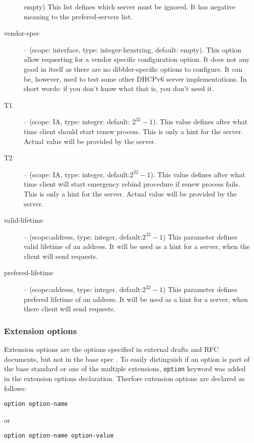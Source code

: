 \begin{description}
	    empty) This list defines which server must be ignored. It
	    has negative meaning to the prefered-servers list.
 \item[vendor-spec] -- (scope: interface, type: integer-hexstring,
	    default: empty). This option allow requesting for a vendor
	    specific configuration option. It does not any good in
	    itself as there are no dibbler-specific options to
	    configure. It can be, however, used to test some other
	    DHCPv6 server implementations. In short words: if you don't
	    know what that is, you don't need it.
 \item[T1] -- (scope: IA, type: integer: default: $2^{32}-1$). This value
	    defines after what time client should start renew
	    process. This is only a hint for the server. Actual value
	    will be provided by the server.
 \item[T2] -- (scope: IA, type: integer, default:$2^{32}-1$). This value
	    defines after what time client will start emergency rebind
	    procedure if renew process fails. This is only a hint for
	    the server. Actual value will be provided by the server.
 \item[valid-lifetime] -- (scope:address, type: integer,
	    default:$2^{32}-1$) This parameter defines valid lifetime of
	    an address. It will be used as a hint for a server, when the
	    client will send requests.
 \item[prefered-lifetime] -- (scope:address, type: integer,
	    default:$2^{32}-1$) This parameter defines prefered lifetime
	    of an address. It will be used as a hint for a server, when
	    there client will send requests.
\end{description}

\subsubsection{Extension options}
\label{client-conf-extension}
Extension options are the options specified in external drafts and RFC
documents, but not in the base spec \cite{rfc3315}. To easily
distinguish if an option is part of the base standard or one of the
multiple extensions, \verb+option+ keyword was added in the extension
options declaration. Therfore extension options are declared as follows:

\begin{verbatim}
option option-name
\end{verbatim}

or

\begin{verbatim}
option option-name option-value
\end{verbatim}

